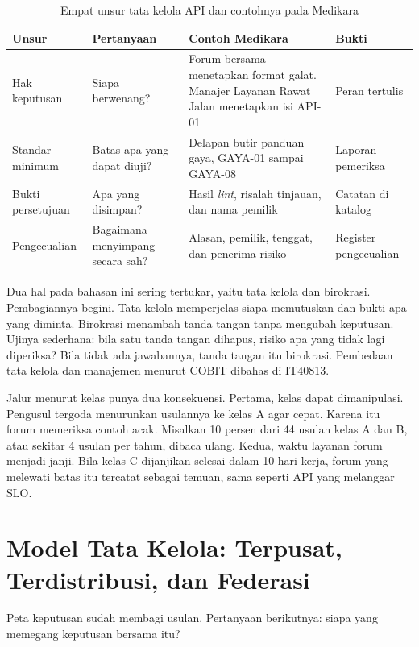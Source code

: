 \begin{table}[!htb]
  \centering
  \caption{Empat unsur tata kelola API dan contohnya pada Medikara}
  \label{tab:ch13-unsur}
  \footnotesize
  \begin{tabularx}{\textwidth}{H{2.2cm}H{3.1cm}GH{2.5cm}}
    \hline
    \textbf{Unsur} & \textbf{Pertanyaan} & \textbf{Contoh Medikara} & \textbf{Bukti} \\ \hline
    Hak keputusan & Siapa berwenang? & Forum bersama menetapkan format galat. Manajer Layanan Rawat Jalan menetapkan isi API-01 & Peran tertulis \\ \hline
    Standar minimum & Batas apa yang dapat diuji? & Delapan butir panduan gaya, GAYA-01 sampai GAYA-08 & Laporan pemeriksa \\ \hline
    Bukti persetujuan & Apa yang disimpan? & Hasil \textit{lint}, risalah tinjauan, dan nama pemilik & Catatan di katalog \\ \hline
    Pengecualian & Bagaimana menyimpang secara sah? & Alasan, pemilik, tenggat, dan penerima risiko & Register pengecualian \\ \hline
  \end{tabularx}
\end{table}

Dua hal pada bahasan ini sering tertukar, yaitu tata kelola dan birokrasi. Pembagiannya begini. Tata kelola memperjelas siapa memutuskan
dan bukti apa yang diminta. Birokrasi menambah tanda tangan tanpa mengubah keputusan. Ujinya sederhana: bila satu tanda tangan dihapus,
risiko apa yang tidak lagi diperiksa? Bila tidak ada jawabannya, tanda tangan itu birokrasi. Pembedaan tata kelola dan manajemen menurut
COBIT dibahas di IT40813.

Jalur menurut kelas punya dua konsekuensi. Pertama, kelas dapat dimanipulasi. Pengusul tergoda menurunkan usulannya ke kelas A agar cepat.
Karena itu forum memeriksa contoh acak. Misalkan 10 persen dari 44 usulan kelas A dan B, atau sekitar 4 usulan per tahun, dibaca ulang.
Kedua, waktu layanan forum menjadi janji. Bila kelas C dijanjikan selesai dalam 10 hari kerja, forum yang melewati batas itu tercatat
sebagai temuan, sama seperti API yang melanggar SLO.

\section{Model Tata Kelola: Terpusat, Terdistribusi, dan Federasi}

Peta keputusan sudah membagi usulan. Pertanyaan berikutnya: siapa yang memegang keputusan bersama itu?

